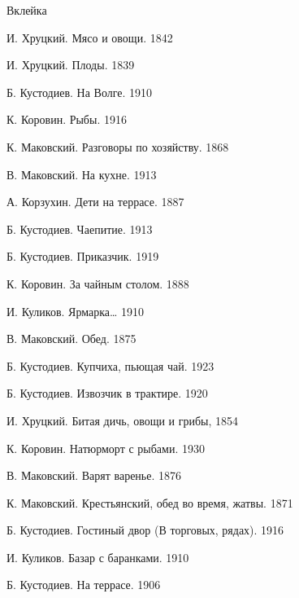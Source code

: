 Вклейка

И. Хруцкий. Мясо и овощи. 1842

И. Хруцкий. Плоды. 1839

Б. Кустодиев. На Волге. 1910

К. Коровин. Рыбы. 1916

К. Маковский. Разговоры по хозяйству. 1868

В. Маковский. На кухне. 1913

А. Корзухин. Дети на террасе. 1887

Б. Кустодиев. Чаепитие. 1913

Б. Кустодиев. Приказчик. 1919

К. Коровин. За чайным столом. 1888

И. Куликов. Ярмарка… 1910

В. Маковский. Обед. 1875

Б. Кустодиев. Купчиха, пьющая чай. 1923

Б. Кустодиев. Извозчик в трактире. 1920

И. Хруцкий. Битая дичь, овощи и грибы, 1854

К. Коровин. Натюрморт с рыбами. 1930

В. Маковский. Варят варенье. 1876

К. Маковский. Крестьянский, обед во время, жатвы. 1871

Б. Кустодиев. Гостиный двор (В торговых, рядах). 1916

И. Куликов. Базар с баранками. 1910

Б. Кустодиев. На террасе. 1906



